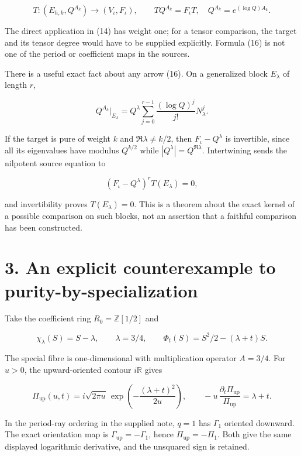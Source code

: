 \documentclass[
  11pt,
]{article}
\begin{document}
\[
T:(E_{h,k},Q^{A_k})\longrightarrow
(V_\iota,F_\iota),\qquad
TQ^{A_k}=F_\iota T,
\quad Q^{A_k}=e^{(\log Q)A_k}.
\tag{16}
\]

The direct application in (14) has weight one; for a tensor comparison,
the target and its tensor degree would have to be supplied explicitly.
Formula (16) is not one of the period or coefficient maps in the
sources.

There is a useful exact fact about any arrow (16). On a generalized
block \(E_\lambda\) of length \(r\),

\[
Q^{A_k}|_{E_\lambda}=Q^\lambda
\sum_{j=0}^{r-1}\frac{(\log Q)^j}{j!}N_\lambda^j.
\tag{17}
\]

If the target is pure of weight \(k\) and \(\Re\lambda\ne k/2\), then
\(F_\iota-Q^\lambda\) is invertible, since all its eigenvalues have
modulus \(Q^{k/2}\) while \(|Q^\lambda|=Q^{\Re\lambda}\). Intertwining
sends the nilpotent source equation to

\[
(F_\iota-Q^\lambda)^r T(E_\lambda)=0,
\tag{18}
\]

and invertibility proves \(T(E_\lambda)=0\). This is a theorem about the
exact kernel of a possible comparison on such blocks, not an assertion
that a faithful comparison has been constructed.

\section{3. An explicit counterexample to
purity-by-specialization}\label{an-explicit-counterexample-to-purity-by-specialization}

Take the coefficient ring \(R_0=\mathbb Z[1/2]\) and

\[
\chi_\lambda(S)=S-\lambda,\qquad \lambda=3/4,
\qquad \Phi_t(S)=S^2/2-(\lambda+t)S.
\tag{19}
\]

The special fibre is one-dimensional with multiplication operator
\(A=3/4\). For \(u>0\), the upward-oriented contour \(i\mathbb R\) gives

\[
\Pi_{\mathrm{up}}(u,t)=i\sqrt{2\pi u}\,
\exp\!\left(-\frac{(\lambda+t)^2}{2u}\right),
\qquad -u\,\frac{\partial_t\Pi_{\mathrm{up}}}{\Pi_{\mathrm{up}}}=\lambda+t.
\tag{20}
\]

In the period-ray ordering in the supplied note, \(q=1\) has
\(\Gamma_1\) oriented downward. The exact orientation map is
\(\Gamma_{\mathrm{up}}=-\Gamma_1\), hence \(\Pi_{\mathrm{up}}=-\Pi_1\).
Both give the same displayed logarithmic derivative, and the unsquared
sign is retained.
\end{document}
